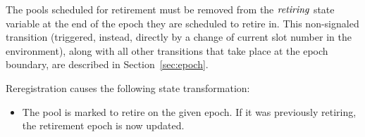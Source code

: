\begin{itemize}
    The pools scheduled for retirement must be removed from
    the $\mathit{retiring}$ state variable at the end of the epoch they are scheduled
    to retire in. This non-signaled transition (triggered, instead, directly by a
    change of current slot number in the environment), along with all other transitions
    that take place at the epoch boundary, are described in Section~\ref{sec:epoch}.

    Reregistration causes the following state transformation:
    \begin{itemize}
      \item The pool is marked to retire on the given epoch.
        If it was previously retiring, the retirement epoch is now updated.
    \end{itemize}
\end{itemize}

